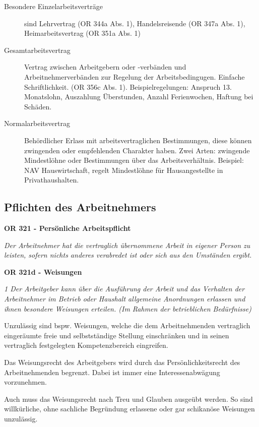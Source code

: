 \begin{description}
  \item[Besondere Einzelarbeitsverträge] sind Lehrvertrag (OR 344a Abs. 1), Handelsreisende (OR 347a Abs. 1), Heimarbeitsvertrag (OR 351a Abs. 1)
  \item[Gesamtarbeitsvertrag] Vertrag zwischen Arbeitgebern oder -verbänden und Arbeitnehmerverbänden zur Regelung der Arbeitsbedingugen. Einfache Schriftlichkeit. (OR 356c Abs. 1). Beispielregelungen: Anspruch 13. Monatslohn, Auszahlung Überstunden, Anzahl Ferienwochen, Haftung bei Schäden. 
  \item[Normalarbeitsvertrag] Behördlicher Erlass mit arbeitsvertraglichen Bestimmungen, diese können zwingenden oder empfehlenden Charakter haben. Zwei Arten: zwingende Mindestlöhne oder Bestimmungen über das Arbeitsverhältnis. Beispiel: NAV Hauswirtschaft, regelt Mindestlöhne für Hausangestellte in Privathaushalten.
\end{description}

\subsection{Pflichten des Arbeitnehmers}
\textbf{OR 321 - Persönliche Arbeitspflicht} 

\textit{Der Arbeitnehmer hat die vertraglich übernommene Arbeit in eigener Person zu leisten,
sofern nichts anderes verabredet ist oder sich aus den Umständen ergibt.}
\vspace{3mm}

\noindent
\textbf{OR 321d - Weisungen}

\textit{1 Der Arbeitgeber kann über die Ausführung der Arbeit und das Verhalten der Arbeitnehmer im Betrieb oder Haushalt allgemeine Anordnungen erlassen und ihnen besondere Weisungen erteilen. (Im Rahmen der betrieblichen Bedürfnisse)}

\noindent
Unzulässig sind bspw. Weisungen, welche die dem Arbeitnehmenden vertraglich eingeräumte
freie und selbstständige Stellung einschränken und in seinen vertraglich festgelegten
Kompetenzbereich eingreifen.

Das Weisungsrecht des Arbeitgebers wird durch das Persönlichkeitsrecht des Arbeitnehmenden
begrenzt. Dabei ist immer eine Interessenabwägung vorzunehmen.

Auch muss das Weisungsrecht nach Treu und Glauben ausgeübt werden. So sind willkürliche,
ohne sachliche Begründung erlassene oder gar schikanöse Weisungen unzulässig.
\vspace{3mm}

